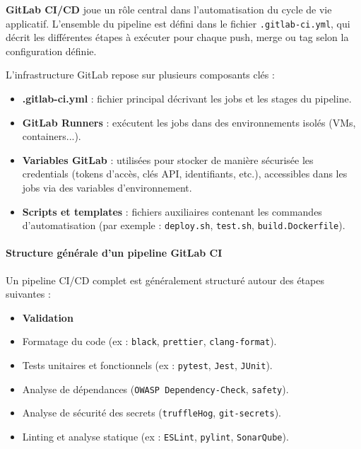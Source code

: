 {\textbf{GitLab CI/CD} joue un rôle central dans l'automatisation du cycle de vie applicatif. L’ensemble du pipeline est défini dans le fichier \texttt{.gitlab-ci.yml}, qui décrit les différentes étapes à exécuter pour chaque push, merge ou tag selon la configuration définie.

L’infrastructure GitLab repose sur plusieurs composants clés :
\begin{itemize}
	\item \textbf{.gitlab-ci.yml} : fichier principal décrivant les jobs et les stages du pipeline.
	\item \textbf{GitLab Runners} : exécutent les jobs dans des environnements isolés (VMs, containers...).
	\item \textbf{Variables GitLab} : utilisées pour stocker de manière sécurisée les credentials (tokens d’accès, clés API, identifiants, etc.), accessibles dans les jobs via des variables d’environnement.
	\item \textbf{Scripts et templates} : fichiers auxiliaires contenant les commandes d’automatisation (par exemple : \texttt{deploy.sh}, \texttt{test.sh}, \texttt{build.Dockerfile}).
\end{itemize}

\paragraph{\textbf{Structure générale d’un pipeline GitLab CI}}

Un pipeline CI/CD complet est généralement structuré autour des étapes suivantes :

\begin{itemize}
	\item \textbf{Validation}
	\item Formatage du code (ex : \texttt{black}, \texttt{prettier}, \texttt{clang-format}).
	\item Tests unitaires et fonctionnels (ex : \texttt{pytest}, \texttt{Jest}, \texttt{JUnit}).
	\item Analyse de dépendances (\texttt{OWASP Dependency-Check}, \texttt{safety}).
	\item Analyse de sécurité des secrets (\texttt{truffleHog}, \texttt{git-secrets}).
	\item Linting et analyse statique (ex : \texttt{ESLint}, \texttt{pylint}, \texttt{SonarQube}).
\end{itemize}

}

